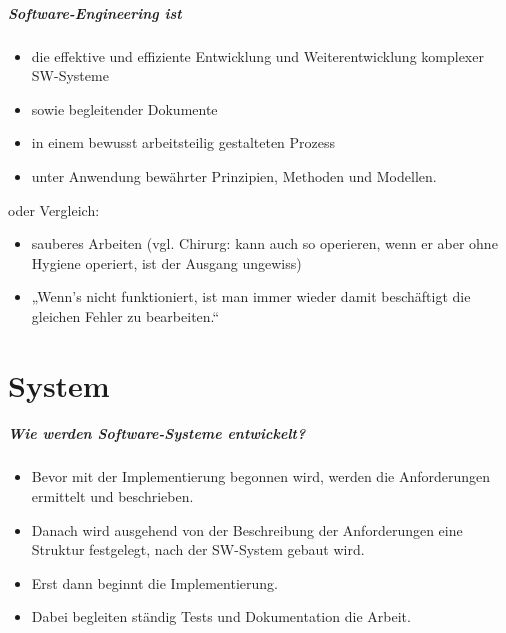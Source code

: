 \paragraph{Software-Engineering ist}
\begin{itemize}
\item die effektive und effiziente Entwicklung und Weiterentwicklung komplexer SW-Systeme
\item sowie begleitender Dokumente
\item in einem bewusst arbeitsteilig gestalteten Prozess
\item unter Anwendung bewährter Prinzipien, Methoden und Modellen.
\end{itemize}
oder Vergleich:
\begin{itemize}
\item sauberes Arbeiten (vgl. Chirurg: kann auch so operieren, wenn er aber ohne Hygiene operiert, ist der Ausgang ungewiss)
\item „Wenn's nicht funktioniert, ist man immer wieder damit beschäftigt die gleichen Fehler zu bearbeiten.“
\end{itemize}


\chapter{System}

\paragraph{Wie werden Software-Systeme entwickelt?}
\begin{itemize}
\item Bevor mit der Implementierung begonnen wird, werden die Anforderungen ermittelt und beschrieben.
\item Danach wird ausgehend von der Beschreibung der Anforderungen eine Struktur festgelegt, nach der SW-System gebaut wird.
\item Erst dann beginnt die Implementierung.
\item Dabei begleiten ständig Tests und Dokumentation die Arbeit.
\end{itemize}
